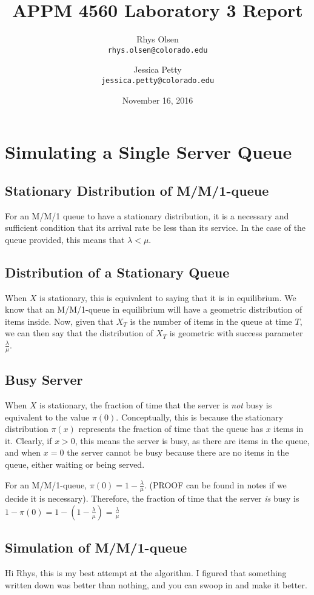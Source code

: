 \documentclass[11pt, oneside]{article}
\title{APPM 4560 Laboratory 3 Report}
\author{Rhys Olsen\\
\texttt{rhys.olsen@colorado.edu}
 \and Jessica Petty\\
 \texttt{jessica.petty@colorado.edu}
 }
\date{November 16, 2016}
\begin{document}
\maketitle
\section{Simulating a Single Server Queue}
\subsection{Stationary Distribution of M/M/1-queue}
For an M/M/1 queue to have a stationary distribution, it is a necessary and sufficient condition that its arrival rate be less than its service. In the case of the queue provided, this means that $\lambda < \mu$.

\subsection{Distribution of a Stationary Queue}
When $X$ is stationary, this is equivalent to saying that it is in equilibrium. We know that an M/M/1-queue in equilibrium will have a geometric distribution of items inside. Now, given that $X_T$ is the number of items in the queue at time $T$, we can then say that the distribution of $X_T$ is geometric with success parameter $\frac{\lambda}{\mu}$.

\subsection{Busy Server}
When $X$ is stationary, the fraction of time that the server is \textit{not} busy is equivalent to the value $\pi(0)$. Conceptually, this is because the stationary distribution $\pi(x)$ represents the fraction of time that the queue has $x$ items in it. Clearly, if $x > 0$, this means the server is busy, as there are items in the queue, and when $x=0$ the server cannot be busy because there are no items in the queue, either waiting or being served.

For an M/M/1-queue, $\pi(0)=1-\frac{\lambda}{\mu}$. (PROOF can be found in notes if we decide it is necessary). Therefore, the fraction of time that the server \textit{is} busy is $1-\pi(0)=1-(1-\frac{\lambda}{\mu})=\frac{\lambda}{\mu}$

\subsection{Simulation of M/M/1-queue}
Hi Rhys, this is my best attempt at the algorithm. I figured that something written down was better than nothing, and you can swoop in and make it better.
\end{document}
